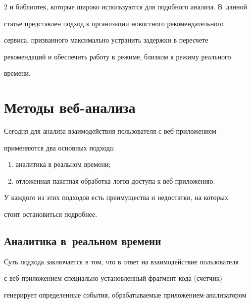 \begin{multicols}{2}
и библиотек, которые широко используются для подобного анализа. В~данной 


статье представлен подход к организации новостного рекомендательного 


сервиса, призванного максимально устранить задержки в пересчете 


рекомендаций и обеспечить работу в режиме, близком к режиму реального 


времени.


   


\section{Методы веб-анализа}





   Сегодня для анализа взаимодействия пользователя с веб-при\-ло\-же\-ни\-ем 


применяются два основных подхода:


   \begin{enumerate}[(1)]


\item аналитика в реальном времени;


\item отложенная пакетная обработка логов доступа к веб-при\-ло\-же\-нию.


   \end{enumerate}


   


   У каждого из этих подходов есть преимущества и недостатки, на которых 


стоит остановиться подробнее.





\subsection{Аналитика в~реальном времени}





   Суть подхода заключается в том, что в ответ на взаимодействие пользователя 


с веб-при\-ло\-же\-ни\-ем специально установленный фрагмент кода (счетчик) 


генерирует определенные события, обрабатываемые при\-ло\-же\-ни\-ем-ана\-ли\-за\-то\-ром 



\end{multicols}
